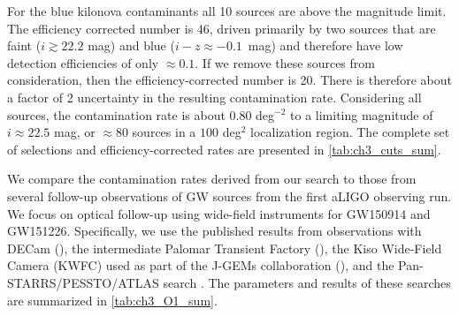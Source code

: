 For the blue kilonova contaminants all 10 sources are above the magnitude limit. The efficiency corrected number is 46, driven primarily by two sources that are faint ($i \gtrsim 22.2$ mag) and blue ($i-z \approx -0.1$~mag) and therefore have low detection efficiencies of only $\approx 0.1$. If we remove these sources from consideration, then the efficiency-corrected number is 20. There is therefore about a factor of 2 uncertainty in the resulting contamination rate. Considering all sources, the contamination rate is about 0.80 deg$^{-2}$ to a limiting magnitude of $i\approx 22.5$ mag, or $\approx 80$ sources in a $100$ deg$^2$ localization region. The complete set of selections and efficiency-corrected rates are presented in \cref{tab:ch3_cuts_sum}.

We compare the contamination rates derived from our search to those from several follow-up observations of GW sources from the first aLIGO observing run. We focus on optical follow-up using wide-field instruments for GW150914 and
GW151226. Specifically, we use the published results from observations with DECam (\citealt{GW150914DECam,Cowp+16}), the intermediate Palomar Transient Factory (\citealt{Kasliwal+16}), the Kiso Wide-Field Camera (KWFC) used as part of the J-GEMs collaboration (\citealt{Morokuma+16,Yoshida+17}), and the Pan-STARRS/PESSTO/ATLAS search \citep{GW150914PS1,GW151226PS1}. The parameters and results of these searches are summarized in \cref{tab:ch3_O1_sum}.

